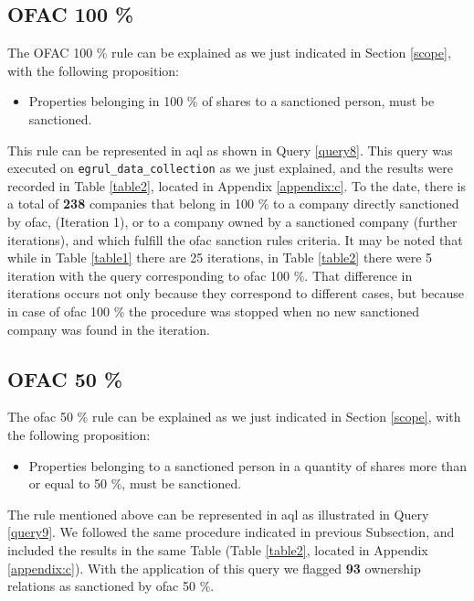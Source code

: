 \begin{spacing}{1.5}
	\subsection{OFAC 100 \%}
		
	The OFAC 100 \% rule can be explained as we just indicated in Section \ref{scope}, with the following proposition:
	
	\begin{itemize}
		\item Properties belonging in 100 \% of shares to a sanctioned person, must be sanctioned. 
	\end{itemize}
	
	This rule can be represented in \gls{aql} as shown in Query \ref{query8}. This query was executed on \texttt{egrul\_data\_collection} as we just explained, and the results were recorded in Table \ref{table2}, located in Appendix \ref{appendix:c}. To the date, there is a total of \textbf{238} companies that belong in 100 \% to a company directly sanctioned by \gls{ofac}, (Iteration 1), or to a company owned by a sanctioned company (further iterations), and which fulfill the \gls{ofac} sanction rules criteria.  It may be noted that while in Table \ref{table1} there are 25 iterations, in Table \ref{table2} there were 5 iteration with the query corresponding to \gls{ofac} 100 \%. That difference in iterations occurs not only because they correspond to different cases, but because in case of \gls{ofac} 100 \% the procedure was stopped when no new sanctioned company was found in the iteration. 
	
	\subsection{OFAC 50 \%}
	
	The \gls{ofac} 50 \% rule can be explained as we just indicated in Section \ref{scope}, with the following proposition:
	
	\begin{itemize}
	\item Properties belonging to a sanctioned person in a quantity of shares more than or equal to 50 \%, must be sanctioned. 
	\end{itemize}
	
	The rule mentioned above can be represented in \gls{aql} as illustrated in Query \ref{query9}. We followed the same procedure indicated in previous Subsection, and included the results in the same Table (Table \ref{table2}, located in Appendix \ref{appendix:c}). With the application of this query we flagged \textbf{93} ownership relations as sanctioned by \gls{ofac} 50 \%. 
	

\end{spacing}

